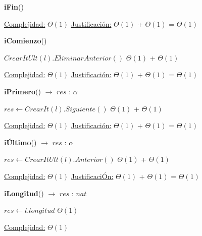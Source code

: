 \begin{Algoritmos}
\begin{algorithm}[H]{\textbf{iFin}()}
\begin{algorithmic}[1]
			\medskip
			\Statex \underline{Complejidad:} $\Theta(1)$
			\Statex \underline{Justificación:} $\Theta(1)$ + $\Theta(1)$ = $\Theta(1)$
    	\end{algorithmic}
\end{algorithm}	
	
\begin{algorithm}[H]{\textbf{iComienzo}()}	
	\begin{algorithmic}[1]
			 \State $CrearItUlt(l).EliminarAnterior()$	\Comment $\Theta(1)$ + $\Theta(1)$
    	    
			\medskip
			\Statex \underline{Complejidad:} $\Theta(1)$
			\Statex \underline{Justificación:} $\Theta(1)$ + $\Theta(1)$ = $\Theta(1)$
			 
    	\end{algorithmic}
\end{algorithm}	
	
\begin{algorithm}[H]{\textbf{iPrimero}() $\to$ $res$ : $\alpha$}	
	\begin{algorithmic}[1]
		 \State $res \gets CrearIt(l).Siguiente()$	\Comment $\Theta(1)$ + $\Theta(1)$

		\medskip
		\Statex \underline{Complejidad:} $\Theta(1)$
		\Statex \underline{Justificación:} $\Theta(1)$ + $\Theta(1)$ = $\Theta(1)$
    \end{algorithmic}
\end{algorithm}	
	
\begin{algorithm}[H]{\textbf{iÚltimo}() $\to$ $res$ : $\alpha$}	
	\begin{algorithmic}[1]
			 \State $res \gets CrearItUlt(l).Anterior()$	\Comment $\Theta(1)$ + $\Theta(1)$
    	    	    
			\medskip
			\Statex \underline{Complejidad:} $\Theta(1)$
			\Statex \underline{JustificaciÓn:} $\Theta(1)$ + $\Theta(1)$ = $\Theta(1)$
    	\end{algorithmic}
\end{algorithm}	
	
\begin{algorithm}[H]{\textbf{iLongitud}() $\to$ $res$ : $nat$}	
	\begin{algorithmic}[1]
			 \State $res \gets l.longitud$	\Comment $\Theta(1)$ 
    	
		\medskip
		\Statex \underline{Complejidad:}  $\Theta(1)$
    \end{algorithmic}
\end{algorithm}	
	

\end{Algoritmos}
